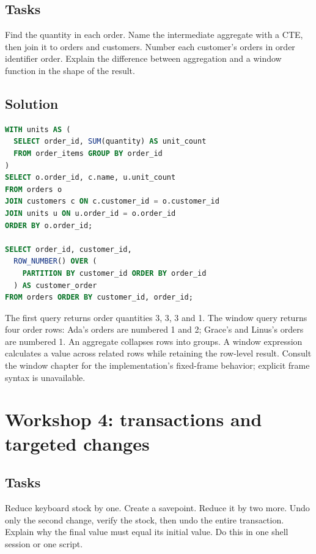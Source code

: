 \subsection{Tasks}
Find the quantity in each order. Name the intermediate aggregate with a CTE,
then join it to orders and customers. Number each customer's orders in order
identifier order. Explain the difference between aggregation and a window
function in the shape of the result.

\subsection{Solution}
\begin{lstlisting}[language=SQL]
WITH units AS (
  SELECT order_id, SUM(quantity) AS unit_count
  FROM order_items GROUP BY order_id
)
SELECT o.order_id, c.name, u.unit_count
FROM orders o
JOIN customers c ON c.customer_id = o.customer_id
JOIN units u ON u.order_id = o.order_id
ORDER BY o.order_id;

SELECT order_id, customer_id,
  ROW_NUMBER() OVER (
    PARTITION BY customer_id ORDER BY order_id
  ) AS customer_order
FROM orders ORDER BY customer_id, order_id;
\end{lstlisting}
The first query returns order quantities 3, 3, 3 and 1. The window query
returns four order rows: Ada's orders are numbered 1 and 2; Grace's and
Linus's orders are numbered 1. An aggregate collapses rows into groups. A
window expression calculates a value across related rows while retaining
the row-level result. Consult the window chapter for the implementation's
fixed-frame behavior; explicit frame syntax is unavailable.

\section{Workshop 4: transactions and targeted changes}
\subsection{Tasks}
Reduce keyboard stock by one. Create a savepoint. Reduce it by two more.
Undo only the second change, verify the stock, then undo the entire
transaction. Explain why the final value must equal its initial value.
Do this in one shell session or one script.

